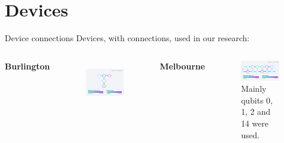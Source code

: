 \section{Devices}

\begin{frame}{Device connections}
Devices, with connections, used in our research:
\vspace{0.5cm}

	\begin{columns}[T]
		\centering \textbf{Burlington}
		\begin{figure}[h] \centering
			\includegraphics[width=\textwidth]{images/connection_diagram_burlington.png}
			\label{fig:burlington_connections}
		\end{figure}
		
		\centering \textbf{Melbourne}
		\begin{figure}[h] \centering
			\includegraphics[width=\textwidth]{images/connection_diagram_melbourne.png}
			\caption*{\tiny Mainly qubits 0, 1, 2 and 14 were used.}
			\label{fig:melbourne_connections}
		\end{figure}
		

\end{columns}
\end{frame}
